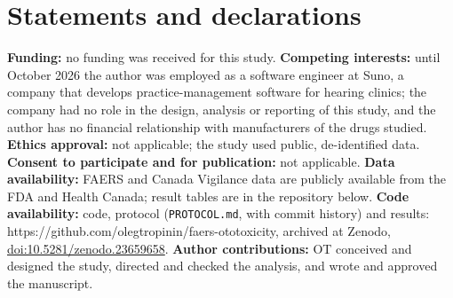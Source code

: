 \documentclass[11pt]{article}
\begin{document}
\section*{Statements and declarations}
\textbf{Funding:} no funding was received for this study.
\textbf{Competing interests:} until October 2026 the author was employed as a software engineer at Suno, a company that develops practice-management software for hearing clinics; the company had no role in the design, analysis or reporting of this study, and the author has no financial relationship with manufacturers of the drugs studied.
\textbf{Ethics approval:} not applicable; the study used public, de-identified data.
\textbf{Consent to participate and for publication:} not applicable.
\textbf{Data availability:} FAERS and Canada Vigilance data are publicly available from the FDA and Health Canada; result
tables are in the repository below.
\textbf{Code availability:} code, protocol (\texttt{PROTOCOL.md}, with commit history) and results: https://github.com/olegtropinin/faers-ototoxicity, archived at Zenodo,
\href{https://doi.org/10.5281/zenodo.23659658}{doi:10.5281/zenodo.23659658}.
\textbf{Author contributions:} OT conceived and designed the study, directed and checked the analysis, and wrote and approved
the manuscript.



\end{document}

